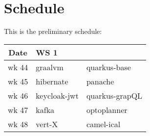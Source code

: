 \clearpage
\section*{Schedule}

This is the preliminary schedule:

\begin{center}
  \begin{tabular}{|c|l|l|}\hline
    \textbf{Date}& \textbf{WS 1}\\\hline
    wk 44 & graalvm & quarkus-base\\\hline
    wk 45 & hibernate & panache\\\hline
    wk 46 & keycloak-jwt & quarkus-grapQL\\\hline
    wk 47 & kafka & optoplanner\\\hline
    wk 48 & vert-X & camel-ical \\\hline
  \end{tabular}
\end{center}

